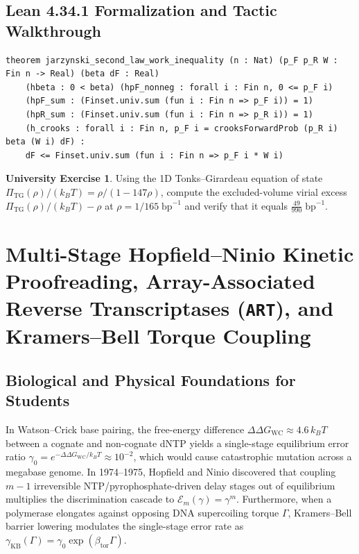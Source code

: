 \documentclass[11pt,a4paper]{article}
\theoremstyle{definition}
\newtheorem{exercise}[theorem]{University Exercise}
\theoremstyle{remark}
\begin{document}
\subsection{Lean 4.34.1 Formalization and Tactic Walkthrough}
\begin{lstlisting}
theorem jarzynski_second_law_work_inequality (n : Nat) (p_F p_R W : Fin n -> Real) (beta dF : Real)
    (hbeta : 0 < beta) (hpF_nonneg : forall i : Fin n, 0 <= p_F i)
    (hpF_sum : (Finset.univ.sum (fun i : Fin n => p_F i)) = 1)
    (hpR_sum : (Finset.univ.sum (fun i : Fin n => p_R i)) = 1)
    (h_crooks : forall i : Fin n, p_F i = crooksForwardProb (p_R i) beta (W i) dF) :
    dF <= Finset.univ.sum (fun i : Fin n => p_F i * W i)
\end{lstlisting}

\begin{exercise}
Using the 1D Tonks--Girardeau equation of state $\Pi_{\mathrm{TG}}(\rho)/(k_B T) = \rho/(1 - 147\rho)$, compute the excluded-volume virial excess $\Pi_{\mathrm{TG}}(\rho)/(k_B T) - \rho$ at $\rho = 1/165\;\mathrm{bp}^{-1}$ and verify that it equals $\frac{49}{990}\;\mathrm{bp}^{-1}$.
\end{exercise}

\section{Multi-Stage Hopfield--Ninio Kinetic Proofreading, Array-Associated Reverse Transcriptases (\texttt{ART}), and Kramers--Bell Torque Coupling}

\subsection{Biological and Physical Foundations for Students}
In Watson--Crick base pairing, the free-energy difference $\Delta\Delta G_{\mathrm{WC}} \approx 4.6\,k_B T$ between a cognate and non-cognate dNTP yields a single-stage equilibrium error ratio $\gamma_0 = e^{-\Delta\Delta G_{\mathrm{WC}}/k_B T} \approx 10^{-2}$, which would cause catastrophic mutation across a megabase genome. In 1974--1975, Hopfield and Ninio discovered that coupling $m-1$ irreversible NTP/pyrophosphate-driven delay stages out of equilibrium multiplies the discrimination cascade to $\mathcal{E}_m(\gamma) = \gamma^m$. Furthermore, when a polymerase elongates against opposing DNA supercoiling torque $\Gamma$, Kramers--Bell barrier lowering modulates the single-stage error rate as $\gamma_{\mathrm{KB}}(\Gamma) = \gamma_0\exp(\beta_{\mathrm{tor}}\Gamma)$.
\end{document}
